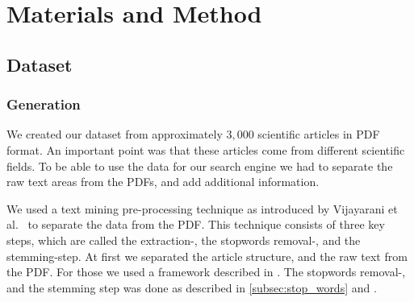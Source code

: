\chapter{Materials and Method}
\label{cha:materials_and_method}

\section{Dataset}
\label{sec:dataset}

\subsection{Generation}
\label{subsec:generation}

We created our dataset from approximately $3,000$ scientific articles in PDF format. An important point was that these articles come from different scientific fields. To be able to use the data for our search engine we had to separate the raw text areas from the PDFs, and add additional information.

We used a text mining pre-processing technique as introduced by Vijayarani et al.~\cite{Vijayarani2015} to separate the data from the PDF. This technique consists of three key steps, which are called the extraction-, the stopwords removal-, and the stemming-step. At first we separated the article structure, and the raw text from the PDF. For those we used a framework described in . The stopwords removal-, and the stemming step was done as described in \cref{subsec:stop_words} and .

